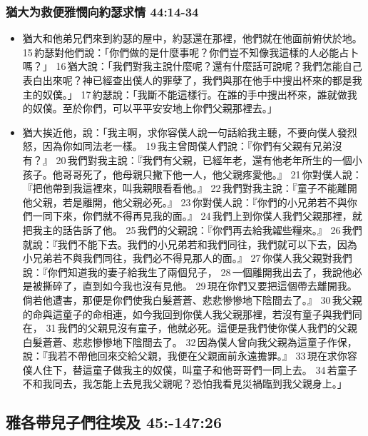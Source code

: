 \subsubsection{猶大为救便雅憫向約瑟求情 44:14-34}
\begin{itemize} 
\itemsep-.35em
\item 猶大和他弟兄們來到約瑟的屋中，約瑟還在那裡，他們就在他面前俯伏於地。 15 約瑟對他們說：「你們做的是什麼事呢？你們豈不知像我這樣的人必能占卜嗎？」 16 猶大說：「我們對我主說什麼呢？還有什麼話可說呢？我們怎能自己表白出來呢？神已經查出僕人的罪孽了，我們與那在他手中搜出杯來的都是我主的奴僕。」 17 約瑟說：「我斷不能這樣行。在誰的手中搜出杯來，誰就做我的奴僕。至於你們，可以平平安安地上你們父親那裡去。」
\item 猶大挨近他，說：「我主啊，求你容僕人說一句話給我主聽，不要向僕人發烈怒，因為你如同法老一樣。 19 我主曾問僕人們說：『你們有父親有兄弟沒有？』 20 我們對我主說：『我們有父親，已經年老，還有他老年所生的一個小孩子。他哥哥死了，他母親只撇下他一人，他父親疼愛他。』 21 你對僕人說：『把他帶到我這裡來，叫我親眼看看他。』 22 我們對我主說：『童子不能離開他父親，若是離開，他父親必死。』 23 你對僕人說：『你們的小兄弟若不與你們一同下來，你們就不得再見我的面。』 24 我們上到你僕人我們父親那裡，就把我主的話告訴了他。 25 我們的父親說：『你們再去給我糴些糧來。』 26 我們就說：『我們不能下去。我們的小兄弟若和我們同往，我們就可以下去，因為小兄弟若不與我們同往，我們必不得見那人的面。』 27 你僕人我父親對我們說：『你們知道我的妻子給我生了兩個兒子， 28 一個離開我出去了，我說他必是被撕碎了，直到如今我也沒有見他。 29 現在你們又要把這個帶去離開我。倘若他遭害，那便是你們使我白髮蒼蒼、悲悲慘慘地下陰間去了。』 30 我父親的命與這童子的命相連，如今我回到你僕人我父親那裡，若沒有童子與我們同在， 31 我們的父親見沒有童子，他就必死。這便是我們使你僕人我們的父親白髮蒼蒼、悲悲慘慘地下陰間去了。 32 因為僕人曾向我父親為這童子作保，說：『我若不帶他回來交給父親，我便在父親面前永遠擔罪。』 33 現在求你容僕人住下，替這童子做我主的奴僕，叫童子和他哥哥們一同上去。 34 若童子不和我同去，我怎能上去見我父親呢？恐怕我看見災禍臨到我父親身上。」
\end{itemize}

\subsection{雅各带兒子們往埃及 45:-147:26}
